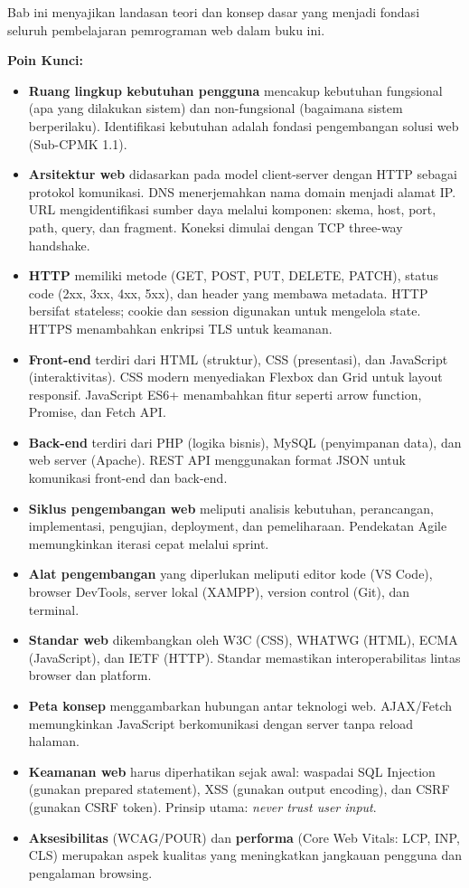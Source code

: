 \documentclass[../main.tex]{subfiles}
\begin{document}
\begin{rangkuman}
Bab ini menyajikan landasan teori dan konsep dasar yang menjadi fondasi seluruh pembelajaran pemrograman web dalam buku ini.

\textbf{Poin Kunci:}
\begin{itemize}
  \item \textbf{Ruang lingkup kebutuhan pengguna} mencakup kebutuhan fungsional (apa yang dilakukan sistem) dan non-fungsional (bagaimana sistem berperilaku). Identifikasi kebutuhan adalah fondasi pengembangan solusi web (Sub-CPMK 1.1).
  \item \textbf{Arsitektur web} didasarkan pada model client-server dengan HTTP sebagai protokol komunikasi. DNS menerjemahkan nama domain menjadi alamat IP. URL mengidentifikasi sumber daya melalui komponen: skema, host, port, path, query, dan fragment. Koneksi dimulai dengan TCP three-way handshake.
  \item \textbf{HTTP} memiliki metode (GET, POST, PUT, DELETE, PATCH), status code (2xx, 3xx, 4xx, 5xx), dan header yang membawa metadata. HTTP bersifat stateless; cookie dan session digunakan untuk mengelola state. HTTPS menambahkan enkripsi TLS untuk keamanan.
  \item \textbf{Front-end} terdiri dari HTML (struktur), CSS (presentasi), dan JavaScript (interaktivitas). CSS modern menyediakan Flexbox dan Grid untuk layout responsif. JavaScript ES6+ menambahkan fitur seperti arrow function, Promise, dan Fetch API.
  \item \textbf{Back-end} terdiri dari PHP (logika bisnis), MySQL (penyimpanan data), dan web server (Apache). REST API menggunakan format JSON untuk komunikasi front-end dan back-end.
  \item \textbf{Siklus pengembangan web} meliputi analisis kebutuhan, perancangan, implementasi, pengujian, deployment, dan pemeliharaan. Pendekatan Agile memungkinkan iterasi cepat melalui sprint.
  \item \textbf{Alat pengembangan} yang diperlukan meliputi editor kode (VS Code), browser DevTools, server lokal (XAMPP), version control (Git), dan terminal.
  \item \textbf{Standar web} dikembangkan oleh W3C (CSS), WHATWG (HTML), ECMA (JavaScript), dan IETF (HTTP). Standar memastikan interoperabilitas lintas browser dan platform.
  \item \textbf{Peta konsep} menggambarkan hubungan antar teknologi web. AJAX/Fetch memungkinkan JavaScript berkomunikasi dengan server tanpa reload halaman.
  \item \textbf{Keamanan web} harus diperhatikan sejak awal: waspadai SQL Injection (gunakan prepared statement), XSS (gunakan output encoding), dan CSRF (gunakan CSRF token). Prinsip utama: \textit{never trust user input}.
  \item \textbf{Aksesibilitas} (WCAG/POUR) dan \textbf{performa} (Core Web Vitals: LCP, INP, CLS) merupakan aspek kualitas yang meningkatkan jangkauan pengguna dan pengalaman browsing.
\end{itemize}
\end{rangkuman}

\ifSubfilesClassLoaded{
  \renewcommand{\bibname}{Daftar Pustaka}
  
  
}{}
\end{document}
